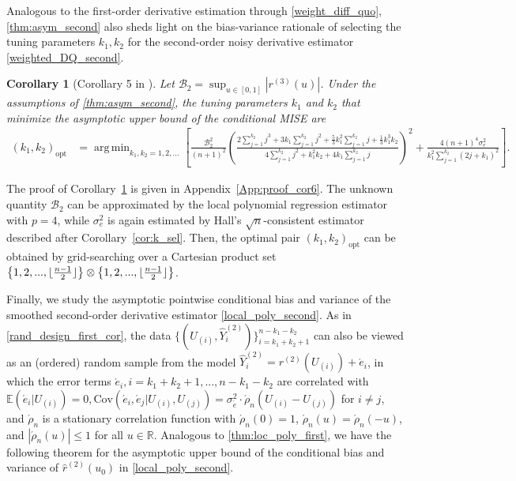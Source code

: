 \documentclass{uwstat572}
\newtheorem{cor}[theorem]{Corollary}
\theoremstyle{definition}
\DeclareMathOperator*{\argmin}{arg\,min}
\DeclarePairedDelimiter\floor{\lfloor}{\rfloor}
\renewcommand{\hat}{\widehat}
\theoremstyle{theorem}
\begin{document}
Analogous to the first-order derivative estimation through \eqref{weight_diff_quo}, \autoref{thm:asym_second} also sheds light on the bias-variance rationale of selecting the tuning parameters $k_1,k_2$ for the second-order noisy derivative estimator \eqref{weighted_DQ_second}.

\begin{cor}[Corollary 5 in \citealt{liu2020smoothed}]
\label{cor:k1_k2_sel}
Let $\mathcal{B}_2=\sup_{u\in [0,1]} \left|r^{(3)}(u)\right|$. Under the assumptions of \autoref{thm:asym_second}, the tuning parameters $k_1$ and $k_2$ that minimize the asymptotic upper bound of the conditional MISE are
\begin{align*}
\left(k_1,k_2\right)_{\text{opt}} &= \argmin_{k_1,k_2=1,2,...} \left[\frac{\mathcal{B}_2^2}{(n+1)^2}  \left(\frac{2\sum\limits_{j=1}^{k_2} j^3 + 3k_1 \sum\limits_{j=1}^{k_2} j^2 + \frac{5}{3} k_1^2 \sum\limits_{j=1}^{k_2}j + \frac{1}{3} k_1^3k_2}{4 \sum_{j=1}^{k_2}j^2 + k_1^2k_2 + 4k_1\sum_{j=1}^{k_2} j} \right)^2 + \frac{4(n+1)^4\sigma_e^2}{k_1^2\sum\limits_{j=1}^{k_2} (2j+k_1)^2} \right].
\end{align*}
\end{cor}

\noindent The proof of Corollary~\ref{cor:k1_k2_sel} is given in Appendix~\ref{App:proof_cor6}. The unknown quantity $\mathcal{B}_2$ can be approximated by the local polynomial regression estimator with $p=4$, while $\sigma_e^2$ is again estimated by Hall's $\sqrt{n}$-consistent estimator described after Corollary~\ref{cor:k_sel}. Then, the optimal pair $\left(k_1,k_2\right)_{\text{opt}}$ can be obtained by grid-searching over a Cartesian product set $\left\{1,2,...,\floor{\frac{n-1}{2}}\right\} \otimes \left\{1,2,...,\floor{\frac{n-1}{2}}\right\}$.

Finally, we study the asymptotic pointwise conditional bias and variance of the smoothed second-order derivative estimator \eqref{local_poly_second}. As in \eqref{rand_design_first_cor}, the data $\{(U_{(i)}, \hat{Y}_i^{(2)})\}_{i=k_1+k_2+1}^{n-k_1-k_2}$ can also be viewed as an (ordered) random sample from the model $\hat{Y}_i^{(2)} =r^{(2)}(U_{(i)}) + \acute{e}_i$, in which the error terms $\acute{e}_i, i=k_1+k_2+1,...,n-k_1-k_2$ are correlated with $\mathbb{E}\left(\acute{e}_i|U_{(i)}\right)=0, \mathrm{Cov}\left(\acute{e}_i,\acute{e}_j|U_{(i)},U_{(j)}\right) = \sigma_{\acute{e}}^2\cdot \acute{\rho}_n(U_{(i)} - U_{(j)})$ for $i\neq j$, and $\acute{\rho}_n$ is a stationary correlation function with $\acute{\rho}_n(0)=1$,  $\acute{\rho}_n(u)=\acute{\rho}_n(-u)$, and $\left|\acute{\rho}_n(u)\right|\leq 1$ for all $u\in \mathbb{R}$. Analogous to \autoref{thm:loc_poly_first}, we have the following theorem for the asymptotic upper bound of the conditional bias and variance of $\hat{r}^{(2)}(u_0)$ in \eqref{local_poly_second}.
\end{document}
